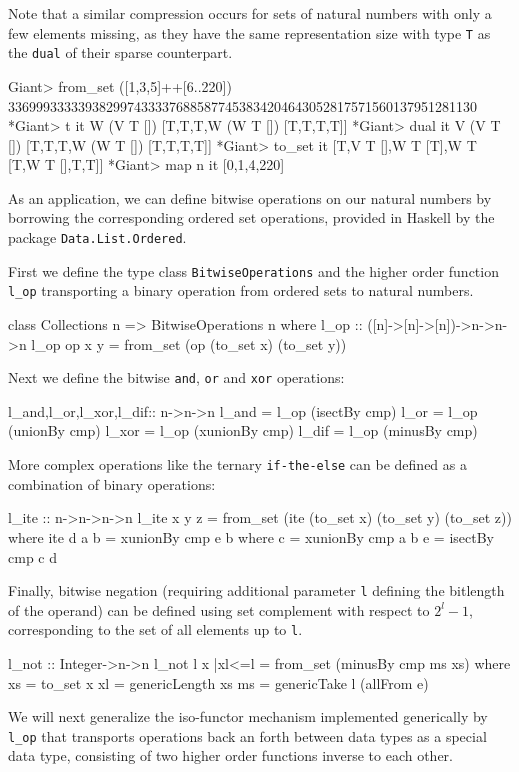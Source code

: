 \documentclass{TOOLS/llncs}
\begin{document}
Note that a similar compression occurs for sets of natural numbers with only a few elements missing, as
they have the same representation size with type {\tt T} as the {\tt dual} of their sparse counterpart.
\begin{codex}
Giant> from_set ([1,3,5]++[6..220])
3369993333393829974333376885877453834204643052817571560137951281130
*Giant> t it
W (V T []) [T,T,T,W (W T []) [T,T,T,T]]
*Giant> dual it
V (V T []) [T,T,T,W (W T []) [T,T,T,T]]
*Giant> to_set it
[T,V T [],W T [T],W T [T,W T [],T,T]]
*Giant> map n it
[0,1,4,220]
\end{codex}

As an application, we can define bitwise operations
on our natural numbers by borrowing the
corresponding ordered set operations, provided in Haskell
by the package {\tt Data.List.Ordered}.

First we define the type class {\tt BitwiseOperations}
and the higher order function {\tt l\_op} transporting
a binary operation from ordered sets to natural numbers.
\begin{code}
class Collections n => BitwiseOperations n where 
  l_op :: ([n]->[n]->[n])->n->n->n
  l_op op x y = from_set (op (to_set x) (to_set y))
\end{code}
Next we define the bitwise {\tt and}, {\tt or} and {\tt xor} operations:
\begin{code}  
  l_and,l_or,l_xor,l_dif:: n->n->n
  l_and = l_op (isectBy cmp)
  l_or = l_op (unionBy cmp)
  l_xor = l_op (xunionBy cmp)
  l_dif = l_op (minusBy cmp)
\end{code}
More complex operations like the ternary {\tt if-the-else}
can be defined as a combination of binary operations:
\begin{code}  
  l_ite :: n->n->n->n
  l_ite x y z = from_set (ite (to_set x) (to_set y) (to_set z)) where
    ite d a b =  xunionBy cmp e b where
      c = xunionBy cmp a b
      e = isectBy cmp c d
\end{code}
Finally, bitwise negation (requiring additional parameter {\tt l}
defining the bitlength of the operand) can be defined using
set complement with respect to $2^{l}-1$, corresponding to the set of all
elements up to {\tt l}.
\begin{code}   
  l_not :: Integer->n->n
  l_not l x |xl<=l = from_set (minusBy cmp ms xs) where
    xs = to_set x
    xl = genericLength xs
    ms = genericTake l (allFrom e)
\end{code}
We will next generalize the iso-functor mechanism 
implemented generically by {\tt l\_op} that
transports operations back an forth
between data types as a special data type,
consisting of two higher order functions
inverse to each other.
\end{document}
